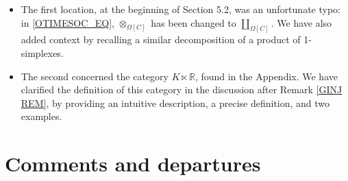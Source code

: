 \documentclass{article}
\begin{document}
\begin{itemize}
\item The first location, at the beginning of Section 5.2, was an unfortunate typo: %
      in \eqref{OTIMESOC_EQ}, $\otimes_{\Omega[C]}$ has been changed to $\coprod_{\Omega[C]}$.
      We have also added context by recalling a similar decomposition of a product of 1-simplexes.

\item The second concerned the category $K \ltimes \mathbb R$, found in the Appendix.
      We have clarified the definition of this category in the discussion after Remark \ref{GINJ REM},
      by providing an intuitive description, a precise definition, and two examples.
\end{itemize}

      

\section{Comments and departures} %
\end{document}
